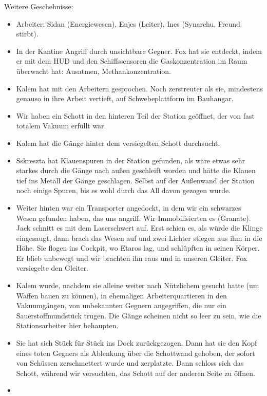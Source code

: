 \documentclass[11pt]{scrartcl}
\begin{document}
Weitere Geschehnisse:

\begin{itemize}
\item
  Arbeiter: Sidan (Energiewesen), Enjes (Leiter), Ines (Synarchu, Freund
  stirbt).
\item
  In der Kantine Angriff durch unsichtbare Gegner. Fox hat sie entdeckt,
  indem er mit dem HUD und den Schiffssensoren die Gaskonzentration im
  Raum überwacht hat: Ausatmen, Methankonzentration.
\item
  Kalem hat mit den Arbeitern gesprochen. Noch zerstreuter als sie,
  mindestens genauso in ihre Arbeit vertieft, auf Schwebeplattform im
  Bauhangar.
\item
  Wir haben ein Schott in den hinteren Teil der Station geöffnet, der
  von fast totalem Vakuum erfüllt war.
\item
  Kalem hat die Gänge hinter dem versiegelten Schott durchsucht.
\item
  Sskreszta hat Klauenspuren in der Station gefunden, als wäre etwas
  sehr starkes durch die Gänge nach außen geschleift worden und hätte
  die Klauen tief ins Metall der Gänge geschlagen. Selbst auf der
  Außenwand der Station noch einige Spuren, bis es wohl durch das All
  davon gezogen wurde.
\item
  Weiter hinten war ein Transporter angedockt, in dem wir ein schwarzes
  Wesen gefunden haben, das uns angriff. Wir Immobilisierten es
  (Granate). Jack schnitt es mit dem Laserschwert auf. Erst schien es,
  als würde die Klinge eingesaugt, dann brach das Wesen auf und zwei
  Lichter stiegen aus ihm in die Höhe. Sie flogen ins Cockpit, wo Etaros
  lag, und schlüpften in seinen Körper. Er blieb unbewegt und wir
  brachten ihn raus und in unseren Gleiter. Fox versiegelte den Gleiter.
\item
  Kalem wurde, nachdem sie alleine weiter nach Nützlichem gesucht hatte
  (um Waffen bauen zu können), in ehemaligen Arbeiterquartieren in den
  Vakuumgängen, von unbekannten Gegnern angegriffen, die nur ein
  Sauerstoffmundstück trugen. Die Gänge scheinen nicht so leer zu sein,
  wie die Stationsarbeiter hier behaupten.
\item
  Sie hat sich Stück für Stück ins Dock zurückgezogen. Dann hat sie den
  Kopf eines toten Gegners als Ablenkung über die Schottwand gehoben,
  der sofort von Schüssen zerschmettert wurde und zerplatzte. Dann
  schloss sich das Schott, während wir versuchten, das Schott auf der
  anderen Seite zu öffnen.
\item

\end{itemize}
\end{document}
